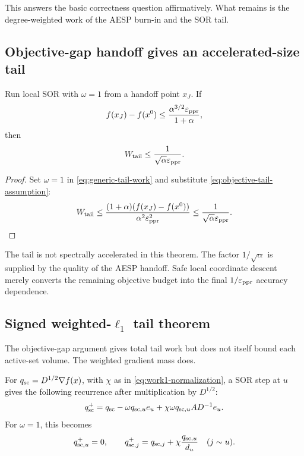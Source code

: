 This answers the basic correctness question affirmatively.  What remains is
the degree-weighted work of the AESP burn-in and the SOR tail.

\subsection{Objective-gap handoff gives an accelerated-size tail}

\begin{theorem}
\label{thm:objective-tail}
Run local SOR with $\omega=1$ from a handoff point $x_J$.  If
\begin{equation}
  f(x_J)-f(x^0)
  \leq\frac{\alpha^{3/2}\varepsilon_{\mathrm{ppr}}}{1+\alpha},
  \label{eq:objective-tail-assumption}
\end{equation}
then
\begin{equation}
  W_{\rm tail}\leq\frac{1}{\sqrt\alpha\varepsilon_{\mathrm{ppr}}}.
  \label{eq:objective-tail-result}
\end{equation}
\end{theorem}

\begin{proof}
Set $\omega=1$ in \cref{eq:generic-tail-work} and substitute
\cref{eq:objective-tail-assumption}:
\[
  W_{\rm tail}
  \leq
  \frac{(1+\alpha)(f(x_J)-f(x^0))}{\alpha^2\varepsilon_{\mathrm{ppr}}^2}
  \leq\frac{1}{\sqrt\alpha\varepsilon_{\mathrm{ppr}}}.
\]
\end{proof}

\begin{remark}
The tail is not spectrally accelerated in this theorem.  The factor
$1/\sqrt\alpha$ is supplied by the quality of the AESP handoff.  Safe local
coordinate descent merely converts the remaining objective budget into the
final $1/\varepsilon_{\mathrm{ppr}}$ accuracy dependence.
\end{remark}

\subsection{Signed weighted-$\ell_1$ tail theorem}

The objective-gap argument gives total tail work but does not itself bound
each active-set volume.  The weighted gradient mass does.

For $q_{\rm sc}=D^{1/2}\nabla f(x)$, with $\chi$ as in
\cref{eq:work1-normalization}, a SOR step at $u$ gives the following recurrence
after multiplication by $D^{1/2}$:
\begin{equation}
  q_{\rm sc}^+=q_{\rm sc}-\omega q_{{\rm sc},u}e_u
  +\chi\omega q_{{\rm sc},u}AD^{-1}e_u.
  \label{eq:q-sor-update}
\end{equation}
For $\omega=1$, this becomes
\begin{equation}
  q_{{\rm sc},u}^+=0,
  \qquad
  q_{{\rm sc},j}^+=q_{{\rm sc},j}
  +\chi\frac{q_{{\rm sc},u}}{d_u}
  \quad(j\sim u).
  \label{eq:q-gs-update}
\end{equation}

